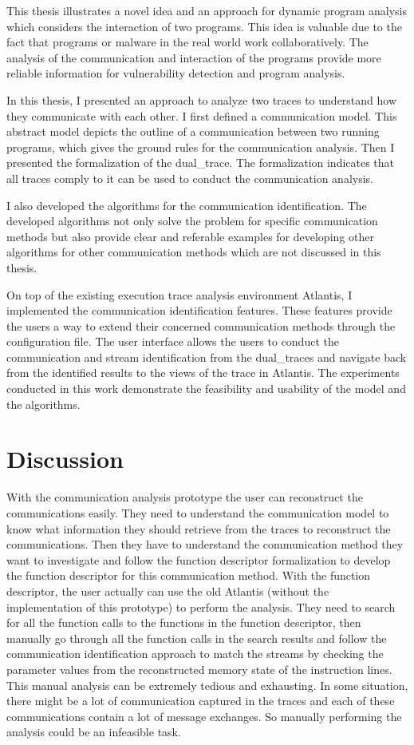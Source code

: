 \label{concl}
This thesis illustrates a novel idea and an approach for dynamic program analysis which considers the interaction of two programs. This idea is valuable due to the fact that programs or malware in the real world work collaboratively. The analysis of the communication and interaction of the programs provide more reliable information for vulnerability detection and program analysis.

In this thesis, I presented an approach to analyze two traces to understand how they communicate with each other. I first defined a communication model. This abstract model depicts the outline of a communication between two running programs, which gives the ground rules for the communication analysis. Then I presented the  formalization of the dual\_trace. The formalization indicates that all traces comply to it can be used to conduct the communication analysis.

I also developed the algorithms for the communication identification. The developed algorithms not only solve the problem for specific communication methods but also provide clear and referable examples for developing other algorithms for other communication methods which are not discussed in this thesis.

On top of the existing execution trace analysis environment Atlantis, I implemented the communication identification features. These features provide the users a way to extend their concerned communication methods through the configuration file. The user interface allows the users to conduct the communication and stream identification from the dual\_traces and navigate back from the identified results to the views of the trace in Atlantis. The experiments conducted in this work demonstrate the feasibility and usability of the model and the algorithms. 

\section{Discussion}
With the communication analysis prototype the user can reconstruct the communications easily. They need to understand the communication model to know what information they should retrieve from the traces to reconstruct the communications. Then they have to understand the communication method they want to investigate and follow the function descriptor formalization to develop the function descriptor for this communication method. With the function descriptor, the user actually can use the old Atlantis (without the implementation of this prototype) to perform the analysis. They need to search for all the function calls to the functions in the function descriptor, then manually go through all the function calls in the search results and follow the communication identification approach to match the streams by checking the parameter values from the reconstructed memory state of the instruction lines. This manual analysis can be extremely tedious and exhausting. In some situation, there might be a lot of communication captured in the traces and each of these communications contain a lot of message exchanges. So manually performing the analysis could be an infeasible task.

